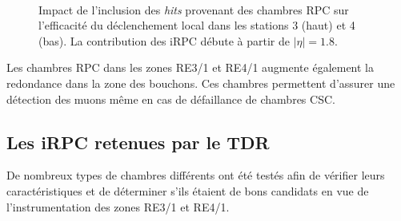 \begin{itemize}[label=$\bullet$]
	\begin{figure}[ht!]
	 	\centering
	 	\\
	 	\caption{Impact de l'inclusion des \textit{hits} provenant des chambres RPC sur l'efficacité du déclenchement local dans les stations \num{3} (haut) et \num{4} (bas). La contribution des iRPC débute à partir de $|\eta|=\num{1.8}$.}
	 	\label{effii}
	 \end{figure}
	
	Les chambres RPC dans les zones RE3/1 et RE4/1 augmente également la redondance dans la zone des bouchons. Ces chambres permettent d'assurer une détection des muons même en cas de défaillance de chambres CSC.
\end{itemize}

\subsection{Les iRPC retenues par le TDR}
De nombreux types de chambres différents ont été testés afin de vérifier leurs caractéristiques et de déterminer s'ils étaient de bons candidats en vue de l'instrumentation des zones RE3/1 et RE4/1.

